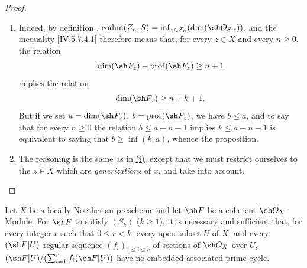 \begin{proof}
\begin{enumerate}[{\rm(i)}]
\item
Indeed, by definition , $\operatorname{codim}(Z_n,S)
=\inf_{z\in Z_n}(\dim(\sh O_{S,z}))$,
and the inequality \eqref{IV.5.7.4.1} therefore means
 that, for every $z\in X$ and every $n\geq0$, the
relation
\[
\dim(\sh F_z)-\operatorname{prof}(\sh F_z)\geq n+1
\]
implies the relation
\[
\dim(\sh F_z)\geq n+k+1.
\]
But if we set $a=\dim(\sh F_z)$,
$b=\operatorname{prof}(\sh F_z)$, we have $b\leq a$, and to say that for
every $n\geq0$ the relation $b\leq a-n-1$ implies $k\leq a-n-1$ is
equivalent to saying that $b\geq\inf(k,a)$, whence the proposition.


\item
The reasoning is the same as in
{\hyperref[IV.5.7.4.i]{\textup{(i)}}}, except that we must restrict
ourselves to the $z\in X$ which are \emph{generizations} of $x$, and
take  into account.
\end{enumerate}
\end{proof}

\begin{proposition}[5.7.5]
\label{IV.5.7.5}
Let $X$ be a locally Noetherian prescheme and let $\sh F$ be a
coherent $\sh O_X$-Module.  For $\sh F$ to satisfy $(S_k)$
\textup{(}$k\geq1$\textup{)}, it is necessary and sufficient that, for
every integer $r$ such that $0\leq r<k$, every open subset $U$ of
$X$, and every $(\sh F|U)$-regular sequence
$(f_i)_{1\leq i\leq r}$ of sections of $\sh O_X$ over $U$,
$(\sh F|U)/(\sum_{i=1}^{r}f_i(\sh F|U))$
have no embedded associated prime cycle.
\end{proposition}

